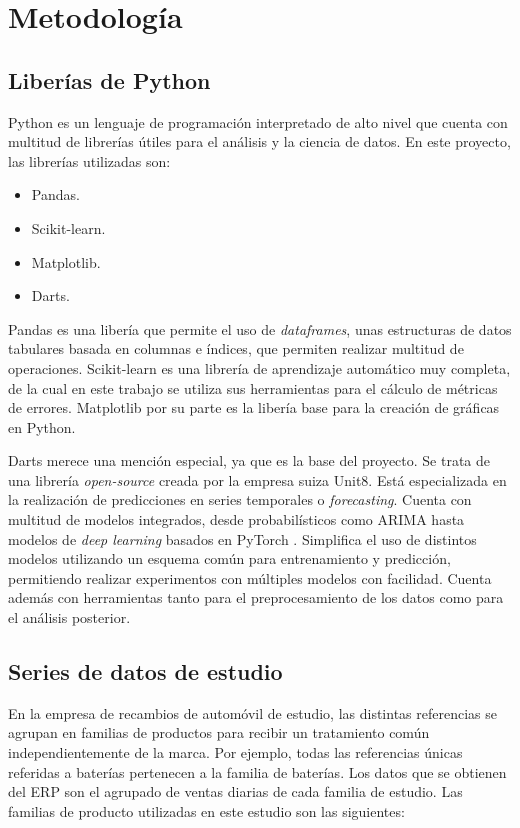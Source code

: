 \chapter{Metodología}\label{cap3}

\section{Liberías de Python}

Python \cite{python} es un lenguaje de programación interpretado de alto nivel que cuenta con multitud de librerías útiles para el análisis y la ciencia de datos. En este proyecto, las librerías utilizadas son:

\begin{itemize}
	\item Pandas.
	\item Scikit-learn.
	\item Matplotlib.
	\item Darts.
\end{itemize}

Pandas \cite{pandas} es una libería que permite el uso de \textit{dataframes}, unas estructuras de datos tabulares basada en columnas e índices, que permiten realizar multitud de operaciones. Scikit-learn \cite{scikit-learn} es una librería de aprendizaje automático muy completa, de la cual en este trabajo se utiliza sus herramientas para el cálculo de métricas de errores. Matplotlib \cite{matplotlib} por su parte es la libería base para la creación de gráficas en Python.

Darts \cite{darts} merece una mención especial, ya que es la base del proyecto. Se trata de una librería \textit{open-source} creada por la empresa suiza Unit8. Está especializada en la realización de predicciones en series temporales o \textit{forecasting}. Cuenta con multitud de modelos integrados, desde probabilísticos como ARIMA hasta modelos de \textit{deep learning} basados en PyTorch \cite{pytorch}. Simplifica el uso de distintos modelos utilizando un esquema común para entrenamiento y predicción, permitiendo realizar experimentos con múltiples modelos con facilidad. Cuenta además con herramientas tanto para el preprocesamiento de los datos como para el análisis posterior.

\section{Series de datos de estudio}

En la empresa de recambios de automóvil de estudio, las distintas referencias se agrupan en familias de productos para recibir un tratamiento común independientemente de la marca. Por ejemplo, todas las referencias únicas referidas a baterías pertenecen a la familia de baterías. Los datos que se obtienen del ERP son el agrupado de ventas diarias de cada familia de estudio. Las familias de producto utilizadas en este estudio son las siguientes:

